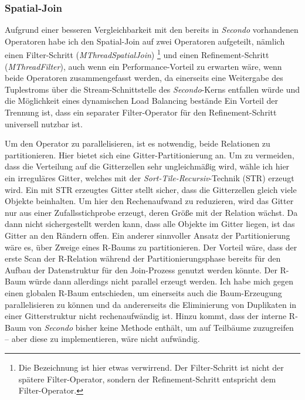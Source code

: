 \documentclass[a4paper,12pt,twoside]{article}
\newcommand{\Fb}[1]{\textit{#1}} %
\begin{document}
\subsubsection{Spatial-Join}
\label{entw:spatial}

Aufgrund einer besseren Vergleichbarkeit mit den bereits in \Fb{Secondo} vorhandenen Operatoren habe ich den Spatial-Join auf zwei Operatoren aufgeteilt, nämlich einen Filter-Schritt (\Fb{MThreadSpatialJoin}) \footnote{Die Bezeichnung ist hier etwas verwirrend. Der Filter-Schritt ist nicht der spätere Filter-Operator, sondern der Refinement-Schritt entspricht dem Filter-Operator.} und einen Refinement-Schritt (\Fb{MThreadFilter}), auch wenn ein Performance-Vorteil zu erwarten wäre, wenn beide Operatoren zusammengefasst werden, da einerseits eine Weitergabe des Tuplestroms über die Stream-Schnittstelle des \Fb{Secondo}-Kerns entfallen würde und die Möglichkeit eines dynamischen Load Balancing bestände Ein Vorteil der Trennung ist, dass ein separater Filter-Operator für den Refinement-Schritt universell nutzbar ist.

Um den Operator zu parallelisieren, ist es notwendig, beide Relationen zu partitionieren. Hier bietet sich eine Gitter-Partitionierung an. Um zu vermeiden, dass die Verteilung auf die Gitterzellen sehr ungleichmäßig wird, wähle ich hier ein irreguläres Gitter, welches mit der \Fb{Sort-Tile-Recursiv}-Technik (STR) erzeugt wird. Ein mit STR erzeugtes Gitter stellt sicher, dass die Gitterzellen gleich viele Objekte beinhalten. Um hier den Rechenaufwand zu reduzieren, wird das Gitter nur aus einer Zufallsstichprobe erzeugt, deren Größe mit der Relation wächst. Da dann nicht sichergestellt werden kann, dass alle Objekte im Gitter liegen, ist das Gitter an den Rändern offen. Ein anderer sinnvoller Ansatz der Partitionierung wäre es, über Zweige eines R-Baums zu partitionieren. Der Vorteil wäre, dass der erste Scan der R-Relation während der Partitionierungsphase bereits für den Aufbau der Datenstruktur für den Join-Prozess genutzt werden könnte. Der R-Baum würde dann allerdings nicht parallel erzeugt werden. Ich habe mich gegen einen globalen R-Baum entschieden, um einerseits auch die Baum-Erzeugung parallelisieren zu können und da andererseits die Eliminierung von Duplikaten in einer Gitterstruktur nicht rechenaufwändig ist. Hinzu kommt, dass der interne R-Baum von \Fb{Secondo} bisher keine Methode enthält, um auf Teilbäume zuzugreifen -- aber diese zu implementieren, wäre nicht aufwändig.
\end{document}
